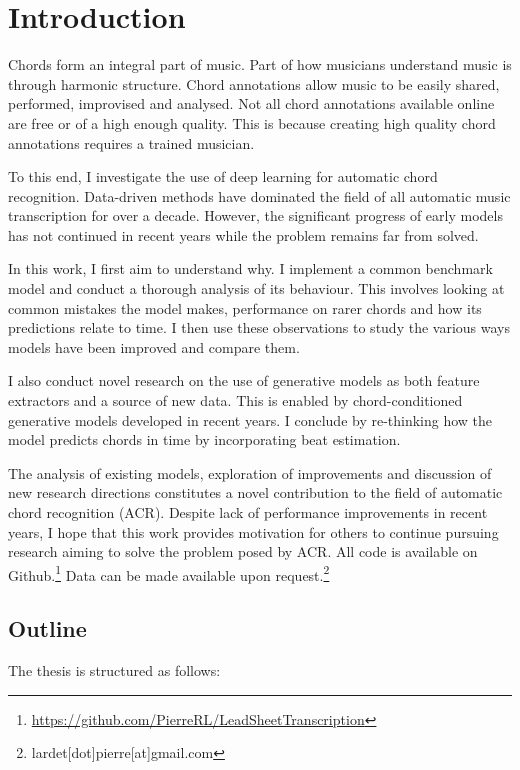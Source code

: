 \chapter{Introduction}

Chords form an integral part of music. Part of how musicians understand music is through harmonic structure. Chord annotations allow music to be easily shared, performed, improvised and analysed. Not all chord annotations available online are free or of a high enough quality. This is because creating high quality chord annotations requires a trained musician. 

To this end, I investigate the use of deep learning for automatic chord recognition. Data-driven methods have dominated the field of all automatic music transcription for over a decade. However, the significant progress of early models has not continued in recent years while the problem remains far from solved.

In this work, I first aim to understand why. I implement a common benchmark model and conduct a thorough analysis of its behaviour. This involves looking at common mistakes the model makes, performance on rarer chords and how its predictions relate to time. I then use these observations to study the various ways models have been improved and compare them. 

I also conduct novel research on the use of generative models as both feature extractors and a source of new data. This is enabled by chord-conditioned generative models developed in recent years. I conclude by re-thinking how the model predicts chords in time by incorporating beat estimation. 

The analysis of existing models, exploration of improvements and discussion of new research directions constitutes a novel contribution to the field of automatic chord recognition (ACR). Despite lack of performance improvements in recent years, I hope that this work provides motivation for others to continue pursuing research aiming to solve the problem posed by ACR. All code is available on Github.\footnote{\url{https://github.com/PierreRL/LeadSheetTranscription}} Data can be made available upon request.\footnote{lardet[dot]pierre[at]gmail.com}

\section{Outline}

The thesis is structured as follows:

